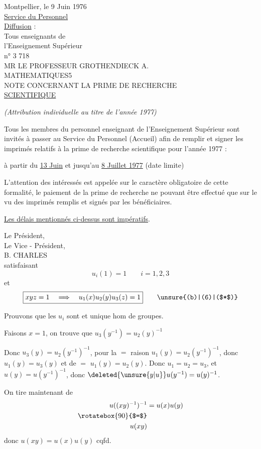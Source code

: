 Montpellier, le 9 Juin 1976\\

\uline{Service du Personnel}\\
\uline{Diffusion} :\\
Tous enseignants de\\
l'Enseignement Supérieur\\
n° 3 718\\

MR LE PROFESSEUR GROTHENDIECK A.\\
MATHEMATIQUES\hfill 5\\

NOTE CONCERNANT LA PRIME DE RECHERCHE\\
\uline{SCIENTIFIQUE}

\textit{(Attribution individuelle au titre de l'année 1977)}

Tous les membres du personnel enseignant de l'Enseignement Supérieur sont invités à passer au Service du Personnel (Accueil) afin de remplir et signer les imprimés relatifs à la prime de recherche scientifique pour l'année 1977 :

à partir du \uline{13 Juin} et jusqu'au \uline{8 Juillet 1977} (date limite)

L'attention des intéressés est appelée sur le caractère obligatoire de cette formalité, le paiement de la prime de recherche ne pouvant être effectué que sur le vu des imprimés remplis et signés par les bénéficiaires.

\uline{Les délais mentionnés ci-dessus sont impératifs}.

Le Président,\\
Le Vice - Président,\\

B. CHARLES\\
satisfaisant
\[
u_i(1)=1\qquad i=1,2,3
\]
et
\[
\boxed{xyz=1\quad\Longrightarrow\quad u_1(x)u_2(y)u_3(z)=1}\tag*{\unsure{(b)|(6)|($*$)}}
\]

Prouvons que les $u_i$ sont   et unique hom de groupes.

Faisons $x=1$, on trouve que $u_3(y^{-1})=u_2(y)^{-1}$

Donc $u_3(y)=u_2(y^{-1})^{-1}$, pour la $=$ raison $u_1(y)=u_2(y^{-1})^{-1}$, donc $u_1(y)=u_3(y)$ et de $=$ $u_1(y)=u_2(y)$. Donc $u_1=u_2=u_3$, et $u(y)=u(y^{-1})^{-1}$, donc $\deleted{\unsure{y|u}}u(y^{-1})=u(y)^{-1}$.

On tire maintenant de 
\[
\begin{aligned}
u((xy)^{-1})^{-1}&=u(x)u(y)\\
\rotatebox{90}{$=$}&\\
u(xy)&
\end{aligned}
\]
donc \qquad $u(xy)=u(x)u(y)$ \qquad cqfd.

